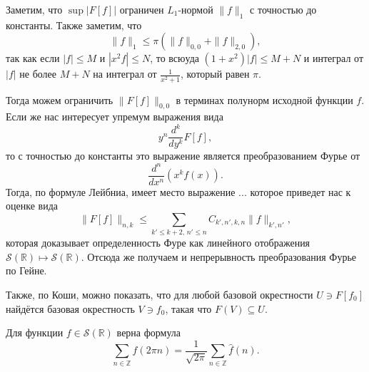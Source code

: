 \begin{uproof}
    Заметим, что $\sup |F[f]|$ ограничен $L_1$-нормой $\|f\|_1$ с точностью до константы. Также заметим, что
    \begin{equation*}
        \|f\|_1 \leq \pi\left(
            \|f\|_{0, 0} + \|f\|_{2, 0}
        \right),
    \end{equation*}
    так как если $|f| \leq M$ и $|x^2 f| \leq N$, то всюуда $(1+x^2)|f| \leq M + N$ и интеграл от $|f|$ не более $M + N$  на интеграл от $\frac{1}{x^2+1}$, который равен $\pi$. 

    Тогда можем ограничить $\|F[f]\|_{0, 0}$ в терминах полунорм исходной функции $f$. Если же нас интересует упремум выражения вида
    \begin{equation*}
        y^n \frac{d^k}{d y^k}  F[f],
    \end{equation*}
    то с точностью до константы это выражение является преобразованием Фурье от
    \begin{equation*}
        \frac{d^n}{dx^n} \left(x^k f(x)\right).
    \end{equation*}
    Тогда, по формуле Лейбниа, имеет место выражение ... которое приведет нас к оценке вида
    \begin{equation*}
        \|F[f]\|_{n, k} \leq \sum_{k' \leq k + 2,\, n' \leq n} C_{k', n', k, n} \|f\|_{k', n'},
    \end{equation*}
    которая доказывает определенность Фуре как линейного отображения $\mathcal S (\mathbb{R}) \mapsto \mathcal S (\mathbb{R})$. Отсюда же получаем и непрерывность преобразования Фурье по Гейне. 
\end{uproof}

Также, по Коши, можно показать, что для любой базовой окрестности $U \ni F[f_0]$ найдётся базовая окрестность $V \ni f_0$, такая что $F(V) \subseteq U$. 

\begin{to_thr}
    Для функции $f \in \mathcal S (\mathbb{R})$ верна формула
    \begin{equation*}
        \sum_{n \in \mathbb{Z}} f(2 \pi n) = \frac{1}{\sqrt{2\pi}} \sum_{n \in \mathbb{Z}} \hat{f}(n).
    \end{equation*}
\end{to_thr}



